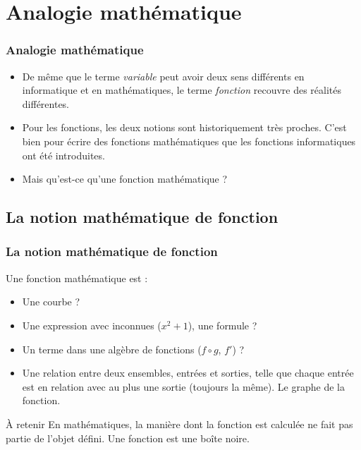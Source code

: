 \documentclass[xcolor=pdftex,svgnames,table]{beamer}
\begin{document}
\section{Analogie mathématique}
\begin{frame}
  \frametitle{Analogie mathématique \nowrite}
 \begin{itemize}
\item De même que le terme \emph{variable} peut avoir deux sens
    différents en informatique et en mathématiques, le terme
    \emph{fonction} recouvre des réalités différentes.\pause

\item Pour les fonctions, les deux notions sont historiquement très
    proches. C'est bien pour écrire des fonctions mathématiques que
    les fonctions informatiques ont été introduites.\pause

\item Mais qu'est-ce qu'une fonction mathématique ?
 \end{itemize}
\end{frame}

\subsection{La notion mathématique de fonction}
\begin{frame}
  \frametitle[En maths]{La notion mathématique de
    fonction}
 Une fonction mathématique est :\pause
  \begin{itemize}
  \item Une courbe ? \pause
  \item Une expression avec inconnues ($x^2 + 1$), une formule ?\pause
  \item Un terme dans une algèbre de fonctions ($f\circ g$, $f'$)
    ?\pause
  \item Une relation entre deux ensembles, entrées et sorties, telle
    que chaque entrée est en relation avec au plus une sortie
    (toujours la même). Le graphe de la fonction.\pause
  \end{itemize}
\pause
\begin{block}{À retenir} 
  En mathématiques, la manière dont la fonction est calculée ne fait
  pas partie de l'objet défini. Une fonction est une boîte noire.
\end{block}

\end{frame}
\end{document}
